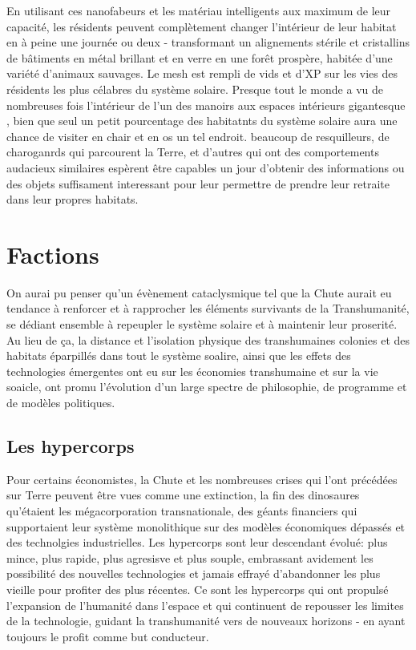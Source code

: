                En utilisant ces nanofabeurs et les matériau intelligents aux maximum de leur capacité, les résidents peuvent complètement changer l'intérieur de leur habitat en à peine une journée ou deux - transformant un alignements stérile et cristallins de bâtiments en métal brillant et en verre en une forêt prospère, habitée d'une variété d'animaux sauvages. Le mesh est rempli de vids et d'XP sur les vies des résidents les plus célabres du système solaire. Presque tout le monde a vu de nombreuses fois l'intérieur de l'un des manoirs aux espaces intérieurs gigantesque , bien que seul un petit pourcentage des habitatnts du système solaire aura une chance de visiter en chair et en os un tel endroit. beaucoup de resquilleurs, de charoganrds qui parcourent la Terre, et d'autres qui ont des comportements audacieux similaires espèrent  être capables un jour d'obtenir des informations ou des objets suffisament interessant pour leur permettre de prendre leur retraite dans leur propres habitats. 

               \section{Factions} \label{sec:factions} 

               On aurai pu penser qu'un évènement cataclysmique tel que la Chute aurait eu tendance à renforcer et à rapprocher les éléments survivants de la Transhumanité, se dédiant ensemble à repeupler le système solaire et à maintenir leur proserité. Au lieu de ça, la distance et l'isolation physique des transhumaines colonies et des habitats éparpillés dans tout le système soalire, ainsi que les effets des technologies émergentes ont eu sur les économies transhumaine et sur la vie soaicle, ont promu l'évolution d'un large spectre de philosophie, de programme et de modèles politiques. 

               \subsection{Les hypercorps} \label{sec:hypercorps} 

               Pour certains économistes, la Chute et les nombreuses crises qui l'ont précédées sur Terre peuvent être vues comme une extinction, la fin des dinosaures qu'étaient les mégacorporation transnationale, des géants financiers qui supportaient leur système monolithique sur des modèles économiques dépassés et des technolgies industrielles. Les hypercorps sont leur descendant évolué: plus mince, plus rapide, plus agresisve et plus souple, embrassant avidement les possibilité des nouvelles technologies et jamais effrayé d'abandonner les plus vieille pour profiter des plus récentes. Ce sont les hypercorps qui ont propulsé l'expansion de l'humanité dans l'espace et qui continuent de repousser les limites de la technologie, guidant la transhumanité vers de nouveaux horizons - en ayant toujours le profit comme but conducteur. 


